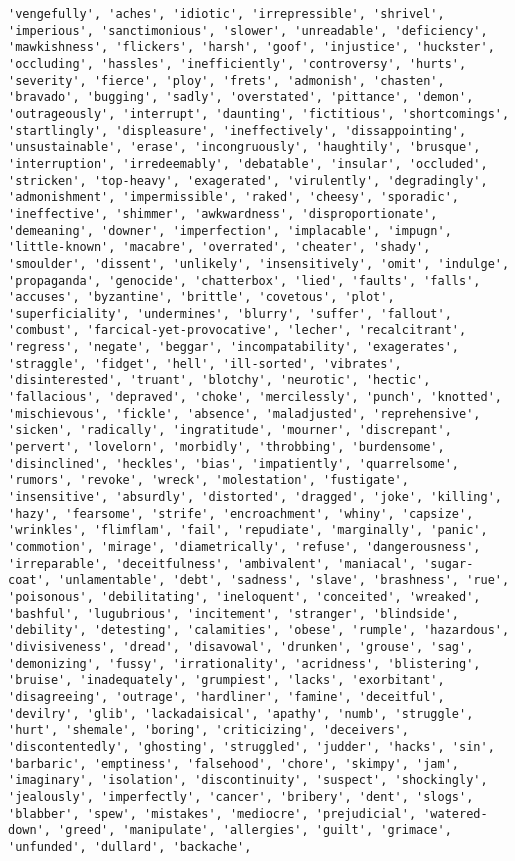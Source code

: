 \documentclass[11pt]{article}
\begin{document}
\begin{Verbatim}[commandchars=\\\{\}]
'vengefully', 'aches', 'idiotic', 'irrepressible', 'shrivel', 'imperious', 'sanctimonious', 'slower', 'unreadable', 'deficiency', 'mawkishness', 'flickers', 'harsh', 'goof', 'injustice', 'huckster', 'occluding', 'hassles', 'inefficiently', 'controversy', 'hurts', 'severity', 'fierce', 'ploy', 'frets', 'admonish', 'chasten', 'bravado', 'bugging', 'sadly', 'overstated', 'pittance', 'demon', 'outrageously', 'interrupt', 'daunting', 'fictitious', 'shortcomings', 'startlingly', 'displeasure', 'ineffectively', 'dissappointing', 'unsustainable', 'erase', 'incongruously', 'haughtily', 'brusque', 'interruption', 'irredeemably', 'debatable', 'insular', 'occluded', 'stricken', 'top-heavy', 'exagerated', 'virulently', 'degradingly', 'admonishment', 'impermissible', 'raked', 'cheesy', 'sporadic', 'ineffective', 'shimmer', 'awkwardness', 'disproportionate', 'demeaning', 'downer', 'imperfection', 'implacable', 'impugn', 'little-known', 'macabre', 'overrated', 'cheater', 'shady', 'smoulder', 'dissent', 'unlikely', 'insensitively', 'omit', 'indulge', 'propaganda', 'genocide', 'chatterbox', 'lied', 'faults', 'falls', 'accuses', 'byzantine', 'brittle', 'covetous', 'plot', 'superficiality', 'undermines', 'blurry', 'suffer', 'fallout', 'combust', 'farcical-yet-provocative', 'lecher', 'recalcitrant', 'regress', 'negate', 'beggar', 'incompatability', 'exagerates', 'straggle', 'fidget', 'hell', 'ill-sorted', 'vibrates', 'disinterested', 'truant', 'blotchy', 'neurotic', 'hectic', 'fallacious', 'depraved', 'choke', 'mercilessly', 'punch', 'knotted', 'mischievous', 'fickle', 'absence', 'maladjusted', 'reprehensive', 'sicken', 'radically', 'ingratitude', 'mourner', 'discrepant', 'pervert', 'lovelorn', 'morbidly', 'throbbing', 'burdensome', 'disinclined', 'heckles', 'bias', 'impatiently', 'quarrelsome', 'rumors', 'revoke', 'wreck', 'molestation', 'fustigate', 'insensitive', 'absurdly', 'distorted', 'dragged', 'joke', 'killing', 'hazy', 'fearsome', 'strife', 'encroachment', 'whiny', 'capsize', 'wrinkles', 'flimflam', 'fail', 'repudiate', 'marginally', 'panic', 'commotion', 'mirage', 'diametrically', 'refuse', 'dangerousness', 'irreparable', 'deceitfulness', 'ambivalent', 'maniacal', 'sugar-coat', 'unlamentable', 'debt', 'sadness', 'slave', 'brashness', 'rue', 'poisonous', 'debilitating', 'ineloquent', 'conceited', 'wreaked', 'bashful', 'lugubrious', 'incitement', 'stranger', 'blindside', 'debility', 'detesting', 'calamities', 'obese', 'rumple', 'hazardous', 'divisiveness', 'dread', 'disavowal', 'drunken', 'grouse', 'sag', 'demonizing', 'fussy', 'irrationality', 'acridness', 'blistering', 'bruise', 'inadequately', 'grumpiest', 'lacks', 'exorbitant', 'disagreeing', 'outrage', 'hardliner', 'famine', 'deceitful', 'devilry', 'glib', 'lackadaisical', 'apathy', 'numb', 'struggle', 'hurt', 'shemale', 'boring', 'criticizing', 'deceivers', 'discontentedly', 'ghosting', 'struggled', 'judder', 'hacks', 'sin', 'barbaric', 'emptiness', 'falsehood', 'chore', 'skimpy', 'jam', 'imaginary', 'isolation', 'discontinuity', 'suspect', 'shockingly', 'jealously', 'imperfectly', 'cancer', 'bribery', 'dent', 'slogs', 'blabber', 'spew', 'mistakes', 'mediocre', 'prejudicial', 'watered-down', 'greed', 'manipulate', 'allergies', 'guilt', 'grimace', 'unfunded', 'dullard', 'backache', 
\end{Verbatim}
\end{document}
